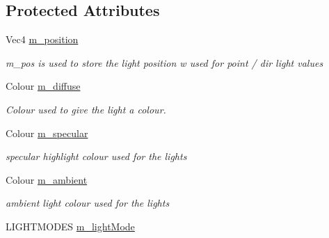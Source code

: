 \subsection*{Protected Attributes}
\begin{DoxyCompactItemize}
\item 
\hypertarget{classngl_1_1_light_afe8a51aeb598b51b3c42a6ecddd38d08}{Vec4 \hyperlink{classngl_1_1_light_afe8a51aeb598b51b3c42a6ecddd38d08}{m\-\_\-position}}\label{classngl_1_1_light_afe8a51aeb598b51b3c42a6ecddd38d08}

\begin{DoxyCompactList}\small\item\em m\-\_\-pos is used to store the light position w used for point / dir light values \end{DoxyCompactList}\item 
\hypertarget{classngl_1_1_light_a7bc1cdc3603b217e66bf4e1d9b1b8e8c}{Colour \hyperlink{classngl_1_1_light_a7bc1cdc3603b217e66bf4e1d9b1b8e8c}{m\-\_\-diffuse}}\label{classngl_1_1_light_a7bc1cdc3603b217e66bf4e1d9b1b8e8c}

\begin{DoxyCompactList}\small\item\em Colour used to give the light a colour. \end{DoxyCompactList}\item 
\hypertarget{classngl_1_1_light_aa12f58491b9237345930721b5ac94932}{Colour \hyperlink{classngl_1_1_light_aa12f58491b9237345930721b5ac94932}{m\-\_\-specular}}\label{classngl_1_1_light_aa12f58491b9237345930721b5ac94932}

\begin{DoxyCompactList}\small\item\em specular highlight colour used for the lights \end{DoxyCompactList}\item 
\hypertarget{classngl_1_1_light_acc8c0099d1b3437bc814d19de9d5025f}{Colour \hyperlink{classngl_1_1_light_acc8c0099d1b3437bc814d19de9d5025f}{m\-\_\-ambient}}\label{classngl_1_1_light_acc8c0099d1b3437bc814d19de9d5025f}

\begin{DoxyCompactList}\small\item\em ambient light colour used for the lights \end{DoxyCompactList}\item 
\hypertarget{classngl_1_1_light_acea764757d046277f3dc5d3f4adf5597}{L\-I\-G\-H\-T\-M\-O\-D\-E\-S \hyperlink{classngl_1_1_light_acea764757d046277f3dc5d3f4adf5597}{m\-\_\-light\-Mode}}\label{classngl_1_1_light_acea764757d046277f3dc5d3f4adf5597}


\end{DoxyCompactItemize}
